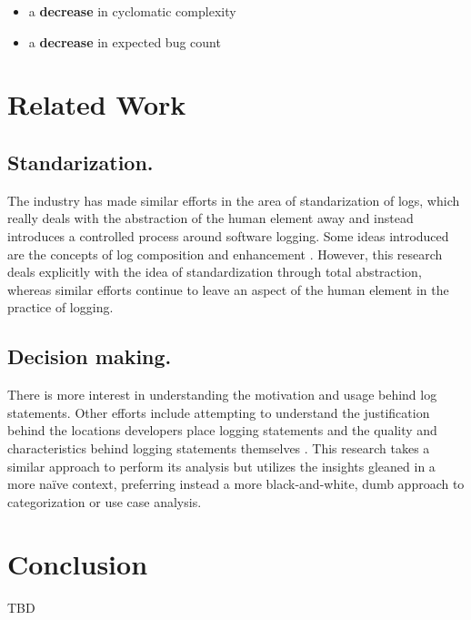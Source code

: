 \documentclass[acmsmall,review,authorversion]{acmart}
\begin{document}
\begin{itemize}
    \item a \textbf{decrease} in cyclomatic complexity
    \item a \textbf{decrease} in expected bug count
\end{itemize}


\section{Related Work}

    \subsection{Standarization.} The industry has made similar efforts in the area of standarization of logs, which really deals with the abstraction of the human element away and instead introduces a controlled process around software logging. Some ideas introduced are the concepts of log composition \cite{DBLP:conf/dls/Marron18} and enhancement \cite{DBLP:journals/tocs/YuanZPZS12}. However, this research deals explicitly with the idea of standardization through total abstraction, whereas similar efforts continue to leave an aspect of the human element in the practice of logging.

    \subsection{Decision making.} There is more interest in understanding the motivation and usage behind log statements. Other efforts include attempting to understand the justification behind the locations developers place logging statements \cite{DBLP:conf/icse/FuZHLDLZX14} and the quality and characteristics behind logging statements themselves \cite{DBLP:conf/icse/YuanPZ12}. This research takes a similar approach to perform its analysis but utilizes the insights gleaned in a more naïve context, preferring instead a more black-and-white, dumb approach to categorization or use case analysis.

\section{Conclusion}


\begin{acks}
    TBD
\end{acks}




\end{document}
